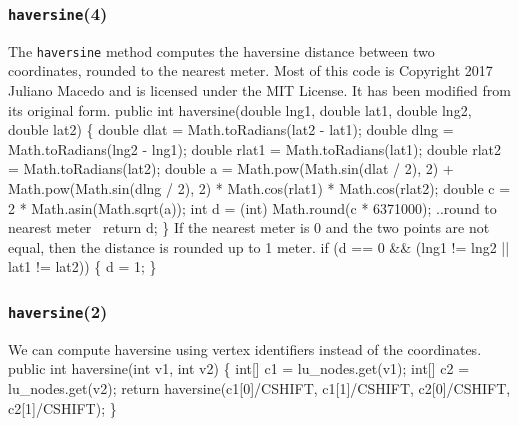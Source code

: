 \documentclass{article}
\def\nwendcode{\endtrivlist \endgroup}
\let\nwdocspar=\par
\theoremstyle{definition}
\begin{document}
\subsubsection{{\tt{}\protect{}\protect{}haversine}(4)}
\label{sec:compute-haversine}
The {\tt{}\protect{}haversine} method computes the haversine distance between two
coordinates, rounded to the nearest meter.  Most of this code is Copyright 2017
Juliano Macedo and is licensed under the MIT License. It has been modified from
its original form.
\nwenddocs{}\endmoddef{}
public int haversine(double lng1, double lat1, double lng2, double lat2) \{
  double dlat = Math.toRadians(lat2 - lat1);
  double dlng = Math.toRadians(lng2 - lng1);
  double rlat1 = Math.toRadians(lat1);
  double rlat2 = Math.toRadians(lat2);
  double a = Math.pow(Math.sin(dlat / 2), 2)
    + Math.pow(Math.sin(dlng / 2), 2)
    * Math.cos(rlat1) * Math.cos(rlat2);
  double c = 2 * Math.asin(Math.sqrt(a));
  int d = (int) Math.round(c * 6371000);
  \LA{}..round to nearest meter~{\nwtagstyle{}}\RA{}
  return d;
\}
\eatline
{}\nwendcode{}If the nearest meter is 0 and the two points are not equal, then the distance
is rounded up to 1 meter.
\nwenddocs{}\endmoddef{}
if (d == 0 && (lng1 != lng2 || lat1 != lat2)) \{
  d = 1;
\}
\nwendcode{}\nwdocspar
\subsubsection{{\tt{}\protect{}haversine}(2)}
We can compute haversine using vertex identifiers instead of the coordinates.
\nwenddocs{}\plusendmoddef
public int haversine(int v1, int v2) \{
  int[] c1 = lu_nodes.get(v1);
  int[] c2 = lu_nodes.get(v2);
  return haversine(c1[0]/CSHIFT, c1[1]/CSHIFT,
                   c2[0]/CSHIFT, c2[1]/CSHIFT);
\}
\nwendcode{}\nwdocspar
\end{document}
